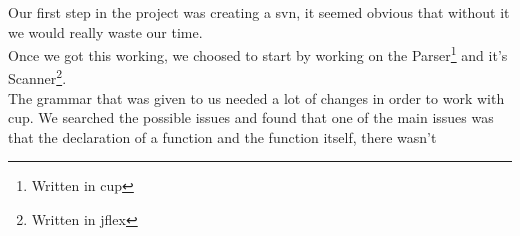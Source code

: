 Our first step in the project was creating a svn, it seemed obvious that
without it we would really waste our time.\\
Once we got this working, we choosed to start by working on the
Parser\footnote{Written in cup} and it's Scanner\footnote{Written in jflex}.\\
The grammar that was given to us needed a lot of changes in order to
work with cup. We searched the possible issues and found that one of the
main issues was that the declaration of a function and the function
itself, there wasn't
